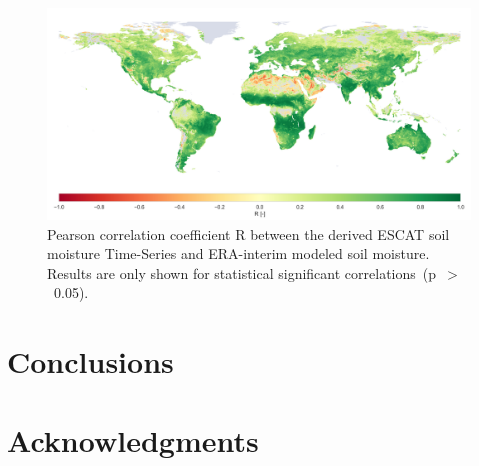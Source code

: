 \documentclass[a4paper,twocolumn]{esapub2005} %
\begin{document}
\begin{figure}
  \centering
  \includegraphics[width=1.\linewidth]{../poster/figures/WARP_SM_ERAINT_R_ALL_map.png}
  \caption{Pearson correlation coefficient R between the derived ESCAT soil moisture Time-Series and ERA-interim modeled soil moisture. Results are only shown for statistical significant correlations~(p~$>$~0.05).\label{figure:lsm_val}}
\end{figure} 

\section{Conclusions}

\section*{Acknowledgments}
\end{document}
